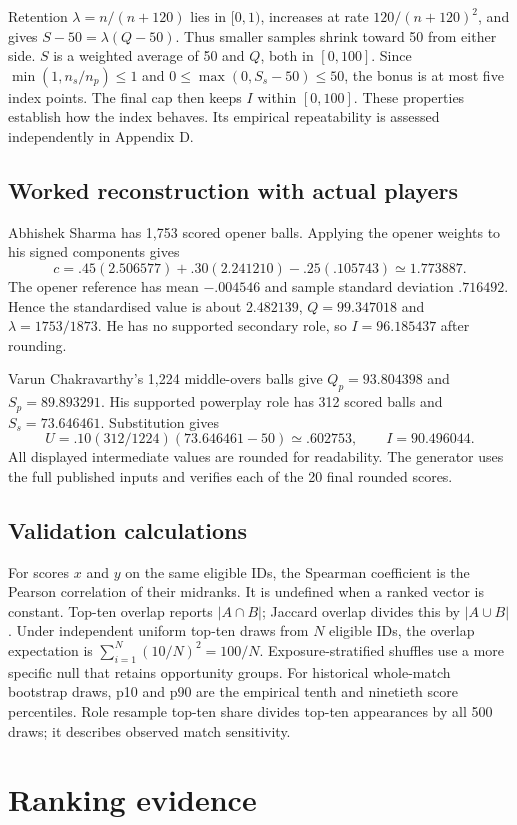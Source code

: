 \documentclass[12pt,a4paper]{article}
\begin{document}
Retention $\lambda=n/(n+120)$ lies in $[0,1)$, increases at rate $120/(n+120)^2$, and gives $S-50=\lambda(Q-50)$. Thus smaller samples shrink toward 50 from either side. $S$ is a weighted average of 50 and $Q$, both in $[0,100]$. Since $\min(1,n_s/n_p)\le1$ and $0\le\max(0,S_s-50)\le50$, the bonus is at most five index points. The final cap then keeps $I$ within $[0,100]$. These properties establish how the index behaves. Its empirical repeatability is assessed independently in Appendix D.

\subsection{Worked reconstruction with actual players}
Abhishek Sharma has 1,753 scored opener balls. Applying the opener weights to his signed components gives
\[
c=.45(2.506577)+.30(2.241210)-.25(.105743)\simeq1.773887.
\]
The opener reference has mean $-.004546$ and sample standard deviation $.716492$. Hence the standardised value is about $2.482139$, $Q=99.347018$ and $\lambda=1753/1873$. He has no supported secondary role, so $I=96.185437$ after rounding.

Varun Chakravarthy's 1,224 middle-overs balls give $Q_p=93.804398$ and $S_p=89.893291$. His supported powerplay role has 312 scored balls and $S_s=73.646461$. Substitution gives
\[
U=.10(312/1224)(73.646461-50)\simeq .602753,\qquad
I=90.496044.
\]
All displayed intermediate values are rounded for readability. The generator uses the full published inputs and verifies each of the 20 final rounded scores.

\subsection{Validation calculations}
For scores $x$ and $y$ on the same eligible IDs, the Spearman coefficient is the Pearson correlation of their midranks. It is undefined when a ranked vector is constant. Top-ten overlap reports $|A\cap B|$; Jaccard overlap divides this by $|A\cup B|$. Under independent uniform top-ten draws from $N$ eligible IDs, the overlap expectation is $\sum_{i=1}^{N}(10/N)^2=100/N$. Exposure-stratified shuffles use a more specific null that retains opportunity groups. For historical whole-match bootstrap draws, p10 and p90 are the empirical tenth and ninetieth score percentiles. Role resample top-ten share divides top-ten appearances by all 500 draws; it describes observed match sensitivity.

\section{Ranking evidence}\label{sec:rankings}
\end{document}
